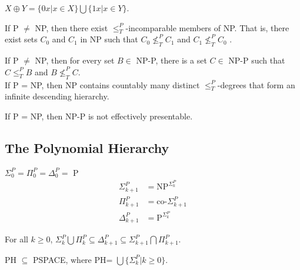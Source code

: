  $X \oplus Y = \{0x | x \in X\} \bigcup \{1x | x \in
Y\}$.

 If P $\ne$ NP, then there exist $\le^P_T$-incomparable
members of NP. That is, there exist sets $C_0$ and $C_1$ in NP such that 
$C_0 \nleq^P_T C_1$ and $C_1 \nleq^P_T C_0$ .

 If P $\ne$ NP, then for every set $B \in$ NP-P, there is a 
set $C \in$ NP-P such that $C \le^P_T B$ and $B \nleq^P_T C$.\\
If P = NP, then NP contains countably many distinct $\le^P_T$-degrees that form 
an infinite descending hierarchy.

 If P = NP, then NP-P is not effectively presentable.


\subsection{The Polynomial Hierarchy}

 $\Sigma^P_0 = \Pi^P_0 = \Delta^P_0 =$ P
\begin{align*}
  \Sigma^P_{k+1} & = \text{NP}^{\Sigma^P_{k}} \\
  \Pi^P_{k+1} &= \text{co-}\Sigma^P_{k+1} \\
  \Delta^P_{k+1} &= \text{P}^{\Sigma^P_{k}} 
\end{align*}

 For all $k \ge 0$, $\Sigma_k^P \bigcup \Pi_k^P \subseteq
\Delta_{k+1}^P \subseteq \Sigma_{k+1}^P \bigcap \Pi_{k+1}^P$.

 PH $\subseteq$ PSPACE, where PH= $\bigcup \{\Sigma^P_k|k \ge
0\}$.
